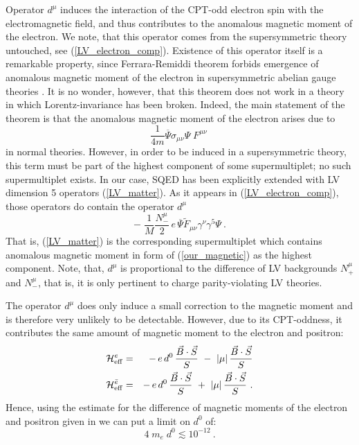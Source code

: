 \documentclass[12pt]{revtex4}
\begin{document}
Operator $ d^\mu $ induces the interaction of the
CPT-odd electron spin with the electromagnetic field,
and thus contributes to the anomalous magnetic
moment of the electron.
We note, that this operator comes from the supersymmetric
theory untouched, see (\ref{LV_electron_comp}).
Existence of this operator itself is a remarkable
property, since Ferrara-Remiddi theorem  
forbids emergence of anomalous magnetic moment of the
electron in supersymmetric abelian gauge theories
\cite{Ferrara:1974wb}.
It is no wonder, however, that this theorem does not work in a theory
in which Lorentz-invariance has been broken.
Indeed, the main statement of the theorem is that 
the anomalous magnetic moment of the electron arises
due to 
\begin{equation}
\label{magnetic}
	\frac{1}{4m} \overline{\Psi} \sigma_{\mu\nu} \Psi \; F^{\mu\nu}~
\end{equation}
in normal theories. 
However, in order to be induced in a supersymmetric theory, 
this term must be part of the highest component of some supermultiplet;
no such supermultiplet exists.
In our case, SQED has been explicitly extended with LV dimension
5 operators (\ref{LV_matter}). 
As it appears in (\ref{LV_electron_comp}), those operators
do contain the operator $ d^\mu $
\begin{equation}
\label{our_magnetic}
	-\; \frac{1}{M} \frac{N_-^\mu}{2}\,
	 e\, \overline{\Psi} \widetilde{F}_{\mu\nu}
                    \gamma^\nu \gamma^5 \Psi~.
\end{equation}
That is, 
(\ref{LV_matter}) is the corresponding supermultiplet which contains
anomalous magnetic moment in form of (\ref{our_magnetic}) as the highest component.
Note, that, $ d^\mu $ is proportional to the difference of LV backgrounds
$ N_+^\mu $ and $ N_-^\mu $, that is, it is only pertinent to
charge parity-violating LV theories.

The operator $ d^\mu $ does only induce a small correction
to the magnetic moment and is therefore very unlikely to
be detectable.
However, due to its CPT-oddness, it contributes
the same amount of magnetic moment to the electron and positron:
\begin{eqnarray*}
 \mathcal{H}_{\rm eff}^{e} & = & 
-\, e\, d^0\, \frac{\vec{B}\cdot\vec{S}}{S}
~-~ 
|\mu|\, \frac{\vec{B}\cdot\vec{S}}{S}
\\
 \mathcal{H}_{\rm eff}^{\bar{e}} & = & 
-\, e\, d^0\, \frac{\vec{B}\cdot\vec{S}}{S}
~+~ 
|\mu|\, \frac{\vec{B}\cdot\vec{S}}{S}~.
\end{eqnarray*}
Hence, using the estimate for the difference
of magnetic moments of the electron and positron given
in
\cite{PDBook}
we can put a limit on $ d^0 $ of:
\begin{equation}
4 \; m_e \; d^0 \lesssim 10^{-12}
~.
\end{equation}
\end{document}
